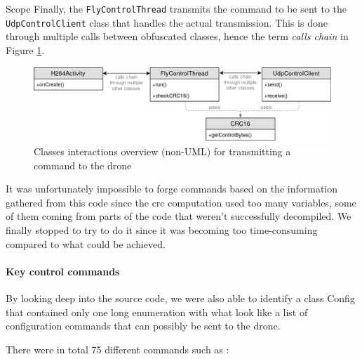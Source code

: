 \begin{chaptercover}{Scope}
Finally, the \texttt{FlyControlThread} transmits the command to be sent to the \texttt{UdpControlClient} class that handles the actual transmission. This is done through multiple calls between obfuscated classes, hence the term \textit{calls chain} in Figure \ref{fig:apk-class-interactions}.

\begin{figure}[H]
  \centering
  \includegraphics[width=.85\linewidth]{figures/apk-class-interactions}
  \caption{Classes interactions overview (non-UML) for transmitting a command to the drone}
  \label{fig:apk-class-interactions}
\end{figure}

It was unfortunately impossible to forge commands based on the information gathered from this code since the \acrshort{crc} computation used too many variables, some of them coming from parts of the code that weren’t successfully decompiled. We finally stopped to try to do it since it was becoming too time-consuming compared to what could be achieved.

\paragraph{Key control commands} By looking deep into the source code, we were also able to identify a class Config that contained only one long enumeration with what look like a list of configuration commands that can possibly be sent to the drone.

There were in total 75 different commands such as :


\end{chaptercover}
